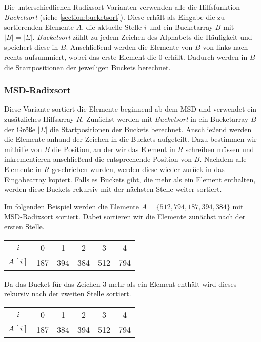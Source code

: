 Die unterschiedlichen Radixsort-Varianten verwenden alle die Hilfsfunktion \emph{Bucketsort} (siehe \cref{section:bucketsort}).
Diese erhält als Eingabe die zu sortierenden Elemente $A$, die aktuelle Stelle $i$ und ein Bucketarray
$B$ mit $|B| = |\Sigma|$. \emph{Bucketsort} zählt zu jedem Zeichen des Alphabets die Häufigkeit
und speichert diese in $B$.
Anschließend werden die Elemente von $B$ von links nach rechts aufsummiert,
wobei das erste Element die $0$ erhält.
Dadurch werden in $B$ die Startpositionen der jeweiligen Buckets berechnet.

\subsubsection{MSD-Radixsort}
\label{sort:radix:msd}

Diese Variante sortiert die Elemente beginnend ab dem MSD und verwendet ein zusätzliches Hilfsarray $R$.
Zunächst werden mit \emph{Bucketsort} in ein Bucketarray $B$ der Größe $|\Sigma|$ die Startpositionen
der Buckets berechnet. Anschließend werden die Elemente anhand der Zeichen in die Buckets aufgeteilt.
Dazu bestimmen wir mithilfe von $B$ die Position, an der wir das Element in $R$ schreiben müssen und
inkrementieren anschließend die entsprechende Position von $B$.
Nachdem alle Elemente in $R$ geschrieben wurden, werden diese wieder zurück in das Eingabearray kopiert.
Falls es Buckets gibt, die mehr als ein Element enthalten, werden diese Buckets rekursiv mit der nächsten
Stelle weiter sortiert.

Im folgenden Beispiel werden die Elemente $A=\{512, 794, 187, 394, 384\}$ mit MSD-Radixsort sortiert.
Dabei sortieren wir die Elemente zunächst nach der ersten Stelle. 

\begin{table}[H]
	\centering
	\begin{tabular}{c|| c | c c | c | c }
		$i$ & 0 & 1 & 2 & 3 & 4 \\
		$A[i]$ & 187 & 394 & 384 & 512 & 794
	\end{tabular}
	\label{tab:radix:msd:step_1}
\end{table}

Da das Bucket für das Zeichen $3$ mehr als ein Element enthält wird dieses rekursiv nach der zweiten Stelle sortiert.

\begin{table}[H]
	\centering
	\begin{tabular}{c|| c | c | c | c | c }
		$i$ & 0 & 1 & 2 & 3 & 4 \\
		$A[i]$ & 187 & 384 & 394 & 512 & 794
	\end{tabular}
	\label{tab:radix:msd:step_2}
\end{table}

